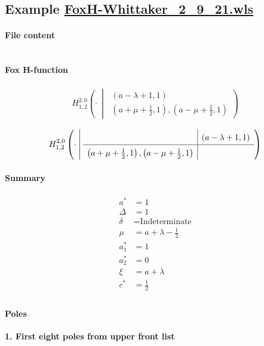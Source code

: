 \documentclass[preview]{standalone}
\newcommand{\FoxH}[5]{H_{#2}^{#1}\left(#3\:\middle\vert\: \begin{array}{l}#4\\[0.4em] #5\end{array}\right)}
\begin{document}
\subsection{Example \url{FoxH-Whittaker_2_9_21.wls}}

\paragraph{File content}

\inputminted{text}{../Examples/FoxH-Whittaker_2_9_21.wls}

\paragraph{Fox H-function}

\begin{align*}
  \FoxH
    {2,0}
    {1,2}
    {\cdot}
    {\left(a-\lambda +1, 1\right)}
    {\left(a+\mu +\frac{1}{2}, 1\right), \left(a-\mu +\frac{1}{2}, 1\right)}
\end{align*}

\begin{align*}
  \FoxHext
    {2,0}
    {1,2}
    {\cdot}
    {}
    {\left(a-\lambda +1, 1\right)}
    {\left(a+\mu +\frac{1}{2}, 1\right), \left(a-\mu +\frac{1}{2}, 1\right)}
    {}
\end{align*}

\paragraph{Summary}

\begin{align*}
  a^*    & = 1 \\
  \Delta & = 1 \\
  \delta & = \text{Indeterminate} \\
  \mu    & = a+\lambda -\frac{1}{2} \\
  a_1^*  & = 1 \\
  a_2^*  & = 0 \\
  \xi    & = a+\lambda \\
  c^*    & = \frac{1}{2} \\
\end{align*}

\paragraph{Poles}

\noindent\textbf{1. First eight poles from upper front list}
\end{document}
